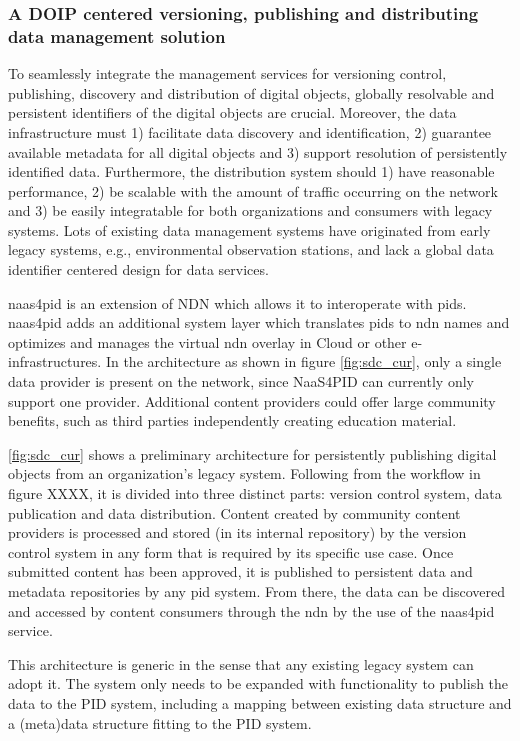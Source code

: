 \documentclass[conference]{IEEEtran}
\begin{document}
\subsubsection{A DOIP centered versioning, publishing and distributing data management solution}
To seamlessly integrate the management services for versioning control, publishing, discovery and distribution of digital objects, globally resolvable and persistent identifiers of the digital objects are crucial. Moreover, the data infrastructure must 1) facilitate data discovery and identification, 2) guarantee available metadata for all digital objects and 3) support resolution of persistently identified data. Furthermore, the distribution system should 1) have reasonable performance, 2) be scalable with the amount of traffic occurring on the network and 3) be easily integratable for both organizations and consumers with legacy systems. Lots of existing data management systems have originated from early legacy systems, e.g., environmental observation stations, and lack a global data identifier centered design for data services.

\gls{naas4pid} is an extension of NDN which allows it to interoperate with \glspl{pid}. \gls{naas4pid} adds an additional system layer which translates \glspl{pid} to \gls{ndn} names and optimizes and manages the virtual \gls{ndn} overlay in Cloud or other e-infrastructures. In the architecture as shown in figure \ref{fig:sdc_cur}, only a single data provider is present on the network, since NaaS4PID can currently only support one provider. Additional content providers could offer large community benefits, such as third parties independently creating education material.

\ref{fig:sdc_cur} shows a preliminary architecture for persistently publishing digital objects from an organization’s legacy system. Following from the workflow in figure XXXX, it is divided into three distinct parts: version control system, data publication and data distribution. Content created by community content providers is processed and stored (in its internal repository) by the version control system in any form that is required by its specific use case. Once submitted content has been approved, it is published to persistent data and metadata repositories by any \gls{pid} system. From there, the data can be discovered and accessed by content consumers through the \gls{ndn} by the use of the \gls{naas4pid} service.

This architecture is generic in the sense that any existing legacy system can adopt it. The system only needs to be expanded with functionality to publish the data to the PID system, including a mapping between existing data structure and a (meta)data structure fitting to the PID system.
\end{document}

